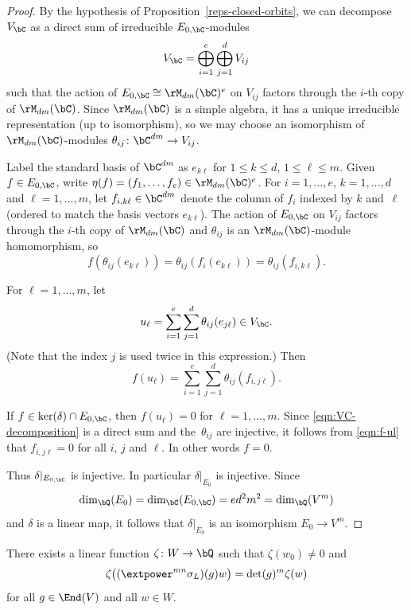 \begin{proof}
By the hypothesis of Proposition~\ref{reps-closed-orbits}, we can decompose $V_\bC$ as a direct sum of irreducible $E_{0,\bC}$-modules
\begin{equation} \label{eqn:VC-decomposition}
V_\bC = \bigoplus_{i=1}^e \bigoplus_{j=1}^d V_{ij}
\end{equation}
such that the action of $E_{0,\bC} \cong \rM_{dm}(\bC)^e$ on $V_{ij}$ factors through the $i$-th copy of $\rM_{dm}(\bC)$.
Since $\rM_{dm}(\bC)$ is a simple algebra, it has a unique irreducible representation (up to isomorphism), so we may choose an isomorphism of $\rM_{dm}(\bC)$-modules $\theta_{ij} \colon \bC^{dm} \to V_{ij}$.

Label the standard basis of $\bC^{dm}$ as $e_{k\ell}$ for $1 \leq k \leq d$, $1 \leq \ell \leq m$.
Given $f \in E_{0,\bC}$, write $\eta(f) = (f_1, \dotsc, f_e) \in \rM_{dm}(\bC)^e$.
For $i = 1, \dotsc, e$, $k = 1, \dotsc, d$ and $\ell = 1, \dotsc, m$, let $f_{i,k\ell} \in \bC^{dm}$ denote the column of $f_i$ indexed by $k$ and~$\ell$ (ordered to match the basis vectors $e_{k\ell}$).
The action of $E_{0,\bC}$ on $V_{ij}$ factors through the $i$-th copy of $\rM_{dm}(\bC)$ and $\theta_{ij}$ is an $\rM_{dm}(\bC)$-module homomorphism, so
\[
f(\theta_{ij}(e_{k\ell})) = \theta_{ij}(f_i(e_{k\ell})) = \theta_{ij}(f_{i,k\ell}).
\]

For $\ell = 1, \dotsc, m$, let
\[
u_\ell = \sum_{i=1}^e \sum_{j=1}^d \theta_{ij}(e_{j\ell}) \in V_\bC.
\]
(Note that the index $j$ is used twice in this expression.)
Then
\begin{equation} \label{eqn:f-ul}
f(u_\ell) = \sum_{i=1}^e \sum_{j=1}^d \theta_{ij}(f_{i,j\ell}).
\end{equation}

If $f \in \ker(\delta) \cap E_{0,\bC}$, then $f(u_\ell) = 0$ for $\ell = 1, \dotsc, m$.
Since \eqref{eqn:VC-decomposition} is a direct sum and the~$\theta_{ij}$ are injective, it follows from \eqref{eqn:f-ul} that $f_{i,j\ell} = 0$ for all $i$, $j$ and $\ell$. In other words $f=0$.

Thus $\delta|_{E_{0,\bC}}$ is injective. In particular $\delta|_{E_0}$ is injective.
Since
\[
\dim_\bQ(E_0) = \dim_\bC(E_{0,\bC}) = ed^2m^2 = \dim_\bQ(V^m)
\]
and $\delta$ is a linear map, it follows that $\delta|_{E_0}$ is an isomorphism $E_0 \to V^m$.
\end{proof}

\begin{lemma}
There exists a linear function $\zeta \colon W \to \bQ$ such that $\zeta(w_0) \neq 0$ and
\[
\zeta \bigl( (\extpower^{mn} \sigma_L)(g)w \bigr) = \det(g)^m \zeta(w)
\]
for all $g \in \End(V)$ and all $w \in W$.
\end{lemma}

